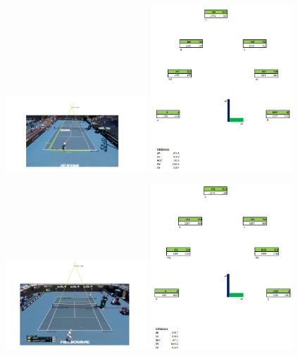\documentclass[12pt, oneside]{article}
\begin{document}
\begin{figure}[H]
  \includegraphics[width=0.475\textwidth]{imgs/tennis1}
  \hfill
  \includegraphics[width=0.475\textwidth]{imgs/tennis1_excel}
\end{figure}

\begin{figure}[H]
  \includegraphics[width=0.475\textwidth]{imgs/tennis2}
  \hfill
  \includegraphics[width=0.475\textwidth]{imgs/tennis2_excel}
\end{figure}
\end{document}
